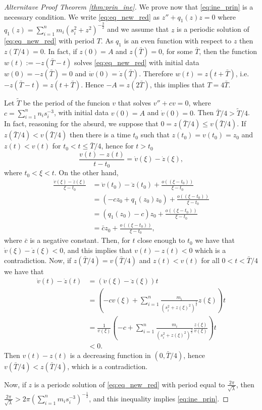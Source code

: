 \documentclass[twoside]{article}
\theoremstyle{remark}
\begin{document}
\begin{proof}[Alternitave Proof Theorem \ref{thm:prin_ine}]
We prove now that \eqref{eq:ine_prin} is a necessary condition. We write \eqref{eq:eq_new_red}
as $z''+q_1(z)z=0$ where $q_1(z)=\sum_{i=1}^{n} m_i \left(s_i^2 +z^2\right)^{-\frac32}$ and we assume that $z$ is a periodic solution of \eqref{eq:eq_new_red} with period $T$. As $q_1$ is an even function with respect to $z$ then $z(T/4)=0$. In fact, if $z(0)=A$ and $z(\bar{T})=0$, for some $\bar{T}$, then the function $w(t):=-z(\bar{T}-t)$ solves \eqref{eq:eq_new_red} with initial data $w(0)=-z(\bar{T})=0$ and $\dot{w}(0)=\dot{z}(\bar{T})$. Therefore $w(t)=z(t+\bar{T})$, i.e. $-z(\bar{T}-t)=z(t+\bar{T})$. Hence $-A=z(2\bar{T})$, this implies that $T=4\bar{T}$. 

Let $\widetilde{T}$ be the period of the funcion $v$  that solves $v''+cv=0$,  where $c=\sum_{i=1}^{n}n_is_i^{-3}$, with initial data $v(0)=A$ and $\dot{v}(0)=0$. Then  $\bar{T}/4>\widetilde{T}/4$. In fact, 
 reasoning for the absurd, we suppose that $0=z(\bar{T}/4)\leq v(\bar{T}/4)$. If $z(\bar{T}/4)< v(\bar{T}/4)$ then there is a time $t_0$ such that $z(t_0)=v(t_0)=z_0$ and $z(t)<v(t)$ for $t_0<t\leq\bar{T}/4$, hence for $t>t_0$
\[\frac{v(t)-z(t)}{t-t_0}=\dot{v}(\xi)-\dot{z}(\xi),\]
where $t_0<\xi<t$. On the other hand, 
\begin{equation*}
\begin{split}
\frac{\dot{v}(\xi)-\dot{z}(\xi)}{\xi-t_0}&=\ddot{v}(t_0)-\ddot{z}(t_0)+\frac{o((\xi-t_0))}{\xi-t_0}\\
&=(-cz_0+q_1(z_0)z_0)+\frac{o((\xi-t_0))}{\xi-t_0}\\
&=(q_{1}(z_0)-c)z_0+\frac{o((\xi-t_0))}{\xi-t_0}\\
&=\bar{c}z_0+\frac{o((\xi-t_0))}{\xi-t_0},
\end{split}
\end{equation*}
where $\bar{c}$ is a negative constant. Then, for  $t$ close enough
 to $t_0$ we have that $\dot{v}(\xi)-\dot{z}(\xi)<0$, and this implies that $v(t)-z(t)<0$ which is a contradiction.
 Now, if $z(\bar{T}/4)= v(\bar{T}/4)$ and $z(t)<v(t)$ for all $0<t<\bar{T}/4$ we have that
\begin{equation*}
\begin{split}
\dot{v}(t)-\dot{z}(t)&=(\ddot{v}(\xi)-\ddot{z}(\xi))t\\
&=\left(-cv(\xi)+\sum_{i=1}^{n}\frac{m_i}{(s_i^2+z(\xi)^2)^{\frac32}}z(\xi)\right)t\\
&=\frac{1}{v(\xi)} \left(-c+\sum_{i=1}^{n}\frac{m_i}{(s_i^2+z(\xi)^2)^{\frac32}}\frac{z(\xi)}{v(\xi)}\right) t\\
&<0.
\end{split}
\end{equation*}
Then $v(t)-z(t)$ is a decreasing function in $(0,\bar{T}/4)$, hence $v(\bar{T}/4)<z(\bar{T}/4)$, which is a contradiction.

Now, if $z$ is a periodc solution of \eqref{eq:eq_new_red} with period equal to $\frac{2\pi}{\sqrt{\lambda}}$, then $\frac{2\pi}{\sqrt{\lambda}}>2\pi \left(\sum_{i=1}^n m_is_i^{-3}\right)^{-\frac12}$, and this inequality implies \eqref {eq:ine_prin}.
\end{proof}
\end{document}
